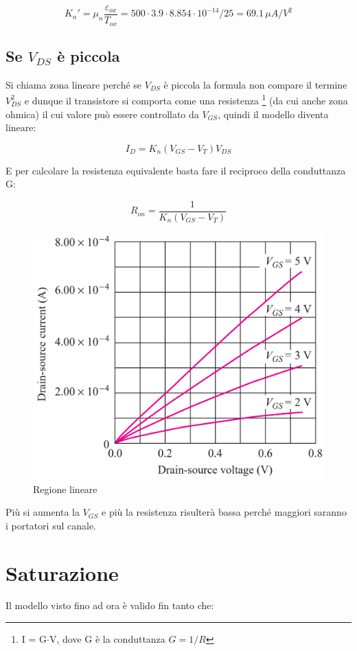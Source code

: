 \begin{equation*}
    K_n' = \mu_n\frac{\varepsilon_{ox}}{T_{ox}} = 500\cdot3.9\cdot8.854\cdot10^{-14}/25 = 69.1\,\mu A/V^2
\end{equation*}

\subsection{Se $V_{DS}$ è piccola}
Si chiama zona lineare perché se $V_{DS}$ è piccola la formula non compare il termine $V_{DS}^2$ e dunque il transistore si comporta come una resistenza \footnote{I = G$\cdot$V, dove G è la conduttanza $G=1/R$} (da cui anche zona ohmica) il cui valore può essere controllato da $V_{GS}$, quindi il modello diventa lineare:

\begin{equation}
    I_D = K_n(V_{GS}-V_{T})V_{DS}
\end{equation}

E per calcolare la resistenza equivalente basta fare il reciproco della conduttanza G:

\begin{equation}
    R_{on} = \frac{1}{K_n(V_{GS}-V_{T})}
\end{equation}

\begin{figure}[htbp]
    \centering
    \includegraphics[width=0.4\linewidth]{img/regione_lineare.png}
    \caption{Regione lineare}
    
\end{figure}

Più si aumenta la $V_{GS}$ e più la resistenza risulterà bassa perché maggiori saranno i portatori sul canale.


\newpage
\section{Saturazione}
Il modello visto fino ad ora è valido fin tanto che:



